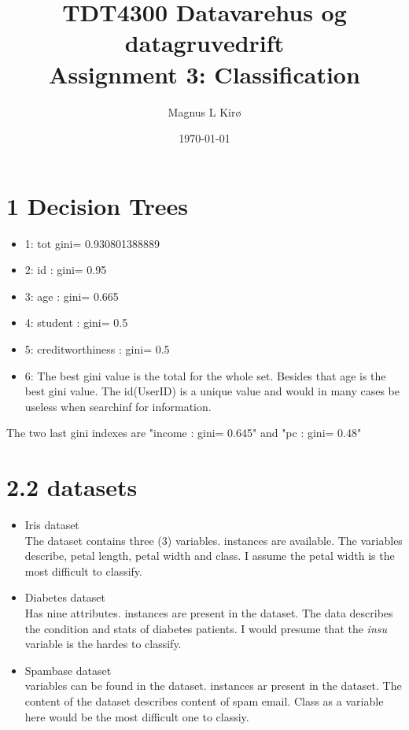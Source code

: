 \documentclass[12pt, a4paper]{article}
\title{TDT4300 Datavarehus og datagruvedrift
\\
Assignment 3: Classification}
\author{
        Magnus L Kirø \\
}
\date{\today}
\begin{document}
\maketitle
{}

\section{1 Decision Trees}
\begin{itemize}
	\item 1: tot gini= 0.930801388889
	\item 2: id : gini= 0.95
	\item 3: age : gini= 0.665
	\item 4: student : gini= 0.5
	\item 5: creditworthiness : gini= 0.5
	\item 6: The best gini value is the total for the whole set. Besides that
age is the best gini value. The id(UserID) is a unique value and would in many
cases be useless when searchinf for information. 
\end{itemize}

The two last gini indexes are "income : gini= 0.645" and "pc : gini= 0.48"

\section{2.2 datasets}

\begin{itemize}
	\item Iris dataset \\
	\subitem The dataset contains three (3) variables. 
	 instances are available. 
	\subitem The variables describe, petal length, petal width and class. 
	\subitem I assume the petal width is the most difficult to classify. 	

	\item Diabetes dataset \\
	\subitem Has nine attributes. 
	 instances are present in the dataset. 
	\subitem The data describes the condition and stats of diabetes patients. 
	\subitem I would presume that the \textit{insu} variable is the hardes to
classify. 

	\item Spambase dataset \\
	 variables can be found in the dataset.
	 instances ar present in the dataset. 
	\subitem The content of the dataset describes content of spam email. 
	\subitem Class as a variable here would be the most difficult one to
classiy. 

\end{itemize}
\end{document}

